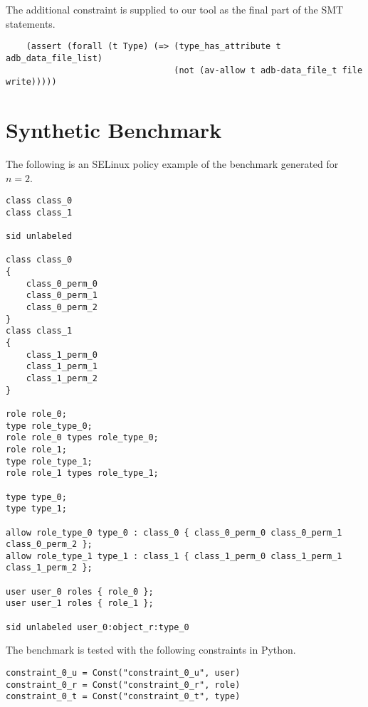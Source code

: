 \documentclass[acmsmall,screen,nonacm]{acmart}
\begin{document}
\begin{appendices}
\bigskip

\noindent The additional constraint is supplied to our tool as the final part 
of the SMT statements.

\begin{small}
\begin{verbatim}
    (assert (forall (t Type) (=> (type_has_attribute t adb_data_file_list)
                                 (not (av-allow t adb-data_file_t file write)))))
\end{verbatim}
\end{small}

\newpage

\section{Synthetic Benchmark}
\label{appendix:benchmark}

The following is an SELinux policy example of the benchmark generated for $n = 2$.

\bigskip

\begin{small}
\begin{verbatim}
class class_0
class class_1

sid unlabeled

class class_0
{
    class_0_perm_0
    class_0_perm_1
    class_0_perm_2
}
class class_1
{
    class_1_perm_0
    class_1_perm_1
    class_1_perm_2
}

role role_0;
type role_type_0;
role role_0 types role_type_0;
role role_1;
type role_type_1;
role role_1 types role_type_1;

type type_0;
type type_1;

allow role_type_0 type_0 : class_0 { class_0_perm_0 class_0_perm_1 
class_0_perm_2 };
allow role_type_1 type_1 : class_1 { class_1_perm_0 class_1_perm_1 
class_1_perm_2 };

user user_0 roles { role_0 };
user user_1 roles { role_1 };

sid unlabeled user_0:object_r:type_0
\end{verbatim}
\end{small}

\newpage

\noindent The benchmark is tested with the following constraints in Python.

\bigskip

\begin{small}
\begin{verbatim}
constraint_0_u = Const("constraint_0_u", user)
constraint_0_r = Const("constraint_0_r", role)
constraint_0_t = Const("constraint_0_t", type)


\end{verbatim}
\end{small}
\end{appendices}
\end{document}
